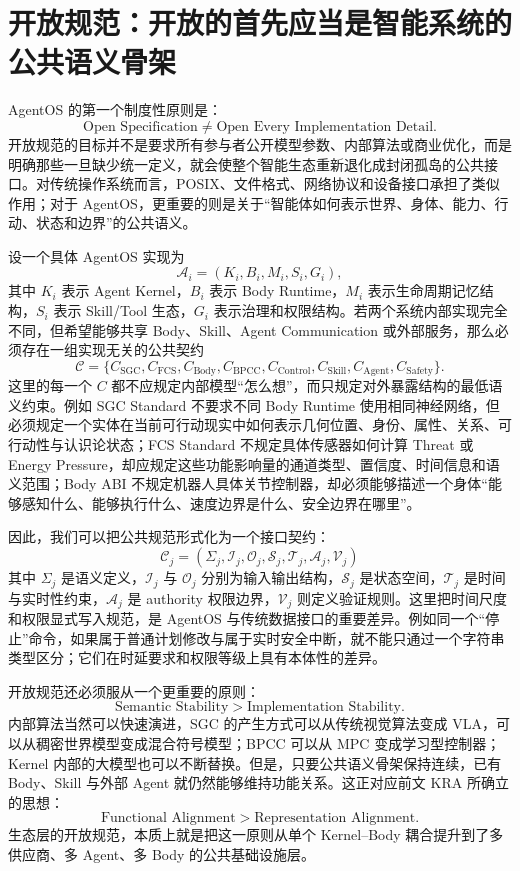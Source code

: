 \section{开放规范：开放的首先应当是智能系统的公共语义骨架}

AgentOS 的第一个制度性原则是：
\[
\boxed{
\text{Open Specification}
\neq
\text{Open Every Implementation Detail}.
}
\]
开放规范的目标并不是要求所有参与者公开模型参数、内部算法或商业优化，而是明确那些一旦缺少统一定义，就会使整个智能生态重新退化成封闭孤岛的公共接口。对传统操作系统而言，POSIX、文件格式、网络协议和设备接口承担了类似作用；对于 AgentOS，更重要的则是关于``智能体如何表示世界、身体、能力、行动、状态和边界''的公共语义。

设一个具体 AgentOS 实现为
\[
\mathcal A_i=
(K_i,B_i,M_i,S_i,G_i),
\]
其中 $K_i$ 表示 Agent Kernel，$B_i$ 表示 Body Runtime，$M_i$ 表示生命周期记忆结构，$S_i$ 表示 Skill/Tool 生态，$G_i$ 表示治理和权限结构。若两个系统内部实现完全不同，但希望能够共享 Body、Skill、Agent Communication 或外部服务，那么必须存在一组实现无关的公共契约
\[
\mathcal C=
\{
C_{\mathrm{SGC}},
C_{\mathrm{FCS}},
C_{\mathrm{Body}},
C_{\mathrm{BPCC}},
C_{\mathrm{Control}},
C_{\mathrm{Skill}},
C_{\mathrm{Agent}},
C_{\mathrm{Safety}}
\}.
\]
这里的每一个 $C$ 都不应规定内部模型``怎么想''，而只规定对外暴露结构的最低语义约束。例如 SGC Standard 不要求不同 Body Runtime 使用相同神经网络，但必须规定一个实体在当前可行动现实中如何表示几何位置、身份、属性、关系、可行动性与认识论状态；FCS Standard 不规定具体传感器如何计算 Threat 或 Energy Pressure，却应规定这些功能影响量的通道类型、置信度、时间信息和语义范围；Body ABI 不规定机器人具体关节控制器，却必须能够描述一个身体``能够感知什么、能够执行什么、速度边界是什么、安全边界在哪里''。

因此，我们可以把公共规范形式化为一个接口契约：
\[
\boxed{
\mathcal C_j=
(\Sigma_j,\mathcal I_j,\mathcal O_j,
\mathcal S_j,\mathcal T_j,\mathcal A_j,\mathcal V_j)
}
\]
其中 $\Sigma_j$ 是语义定义，$\mathcal I_j$ 与 $\mathcal O_j$ 分别为输入输出结构，$\mathcal S_j$ 是状态空间，$\mathcal T_j$ 是时间与实时性约束，$\mathcal A_j$ 是 authority 权限边界，$\mathcal V_j$ 则定义验证规则。这里把时间尺度和权限显式写入规范，是 AgentOS 与传统数据接口的重要差异。例如同一个``停止''命令，如果属于普通计划修改与属于实时安全中断，就不能只通过一个字符串类型区分；它们在时延要求和权限等级上具有本体性的差异。

开放规范还必须服从一个更重要的原则：
\[
\boxed{
\text{Semantic Stability}
>
\text{Implementation Stability}.
}
\]
内部算法当然可以快速演进，SGC 的产生方式可以从传统视觉算法变成 VLA，可以从稠密世界模型变成混合符号模型；BPCC 可以从 MPC 变成学习型控制器；Kernel 内部的大模型也可以不断替换。但是，只要公共语义骨架保持连续，已有 Body、Skill 与外部 Agent 就仍然能够维持功能关系。这正对应前文 KRA 所确立的思想：
\[
\text{Functional Alignment}
>
\text{Representation Alignment}.
\]
生态层的开放规范，本质上就是把这一原则从单个 Kernel--Body 耦合提升到了多供应商、多 Agent、多 Body 的公共基础设施层。

